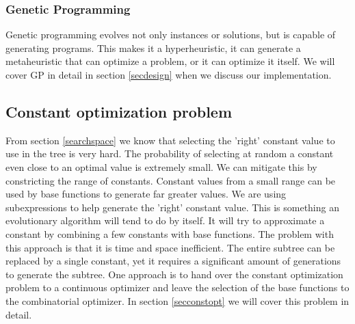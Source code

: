 \subsubsection{Genetic Programming}
Genetic programming \cite{GP} evolves not only instances or solutions, but is capable of generating programs. This makes it a hyperheuristic, it can generate a metaheuristic that can optimize a problem, or it can optimize it itself. We will cover GP in detail in section \ref{secdesign}  when we discuss our implementation.

\subsection{Constant optimization problem}
From section \ref{searchspace} we know that selecting the 'right' constant value to use in the tree is very hard. The probability of selecting at random a constant even close to an optimal value is extremely small. We can mitigate this by constricting the range of constants. Constant values from a small range can be used by base functions to generate far greater values. We are using subexpressions to help generate the 'right' constant value. This is something an evolutionary algorithm will tend to do by itself. It will try to approximate a constant by combining a few constants with base functions. The problem with this approach is that it is time and space inefficient. The entire subtree can be replaced by a single constant, yet it requires a significant amount of generations to generate the subtree. One approach is to hand over the constant optimization problem to a continuous optimizer and leave the selection of the base functions to the combinatorial optimizer. In section \ref{secconstopt} we will cover this problem in detail.

